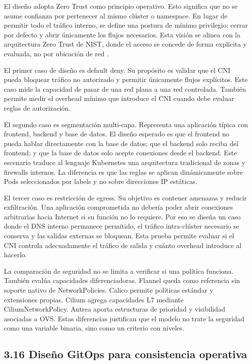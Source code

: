 El diseño adopta Zero Trust como principio operativo. Esto significa que no se asume confianza por pertenecer al mismo clúster o namespace. En lugar de permitir todo el tráfico interno, se define una postura de mínimo privilegio: cerrar por defecto y abrir únicamente los flujos necesarios. Esta visión se alinea con la arquitectura Zero Trust de NIST, donde el acceso se concede de forma explícita y evaluada, no por ubicación de red \cite{ref24,ref25}.

El primer caso de diseño es default deny. Su propósito es validar que el CNI pueda bloquear tráfico no autorizado y permitir únicamente flujos explícitos. Este caso mide la capacidad de pasar de una red plana a una red controlada. También permite medir el overhead mínimo que introduce el CNI cuando debe evaluar reglas de autorización.

El segundo caso es segmentación multi-capa. Representa una aplicación típica con frontend, backend y base de datos. El diseño esperado es que el frontend no pueda hablar directamente con la base de datos; que el backend solo reciba del frontend; y que la base de datos solo acepte conexiones desde el backend. Este escenario traduce al lenguaje Kubernetes una arquitectura tradicional de zonas y firewalls internos. La diferencia es que las reglas se aplican dinámicamente sobre Pods seleccionados por labels y no sobre direcciones IP estáticas.

El tercer caso es restricción de egress. Su objetivo es contener amenazas y reducir exfiltración. Una aplicación comprometida no debería poder abrir conexiones arbitrarias hacia Internet si su función no lo requiere. Por eso se diseña un caso donde el DNS interno permanece permitido, el tráfico intra-clúster necesario se conserva y las salidas externas se bloquean. Esta prueba permite evaluar si el CNI controla adecuadamente el tráfico de salida y cuánto overhead introduce al hacerlo.

La comparación de seguridad no se limita a verificar si una política funciona. También evalúa capacidades diferenciadoras. Flannel queda como referencia sin soporte nativo de NetworkPolicies. Calico permite políticas estándar y extensiones propias. Cilium agrega capacidades L7 mediante CiliumNetworkPolicy. Antrea aporta estructuras de prioridad y visibilidad asociadas a OVS. Estas diferencias justifican que el modelo no trate la seguridad como una variable binaria, sino como un criterio con niveles.

\subsection{3.16 Diseño GitOps para consistencia operativa}

